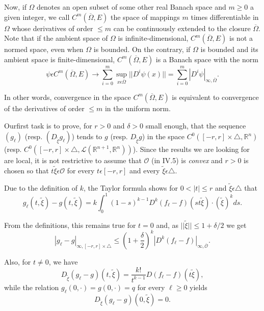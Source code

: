 Now, if $\Omega$ denotes an open subset of some other real Banach
space and $m \geq 0$ a given integer, we call
$C^{m}(\overline{\Omega}, E)$ the space of mappings $m$ times
differentiable in $\Omega$ whose derivatives of order $\leq m$ can be
continuously extended to the closure $\overline{\Omega}$. Note that if
the ambient space of $\Omega$ is infinite-dimensional,
$C^{m}(\overline{\Omega}, E)$ is not a normed space, even when
$\Omega$ is bounded. On the contrary, if $\Omega$ is bounded and its
ambient space is finite-dimensional, $C^{m}(\overline{\Omega}, E)$ is
a Banach space with the norm
$$
\psi \epsilon C^{m}(\overline{\Omega}, E) \to \sum\limits_{i=0}^{m}
\sup_{x \epsilon \overline{\Omega}} ||D^{i} \psi (x)|| =
\sum\limits_{i=0}^{m} |D^{i} \psi|_{\infty, \overline{\Omega}}.
$$

In other words, convergence in the space $C^{m}(\overline{\Omega}, E)$
is equivalent to convergence of the derivatives of order $\leq m$ in
the uniform norm.

Our\pageoriginale first task is to prove, for $r > 0$ and $\delta > 0$
small enough, that the sequence $(g_{\ell})$
(resp. $(D_{\widetilde{\xi}}g_{\ell})$) tends to $g$
(resp. $D_{\widetilde{\xi}}g$) in the space $C^{0}([-r, r] \times
\triangle, \mathbb{R}^{n})$ (resp. $C^{0} ([-r, r] \times \triangle,
\mathscr{L} (\mathbb{R}^{n+1}, \mathbb{R}^{n}))$). Since the results
we are looking for are local, it is not restrictive to assume that
$\mathscr{O}$ (in IV.5) is {\em convex} and $r > 0$ is chosen so that
$t \widetilde{\xi} \epsilon \mathscr{O}$ for every $t \epsilon [-r,
  r]$ and every $\widetilde{\xi} \epsilon \triangle$.

Due to the definition of $k$, the Taylor formula shows for $0 < |t| \leq
r$ and $\widetilde{\xi} \epsilon \triangle$ that
$$
g_{\ell} (t, \widetilde{\xi}) -g(t, \widetilde{\xi}) = k \int_{0}^{1}
(1-s)^{k-1} D^{k} (f_{\ell} - f) (st \widetilde{\xi}) \cdot
(\widetilde{\xi})^{k} ds.
$$

From the definitions, this remains true for $t = 0$ and, as
$||\widetilde{\xi}|| \leq 1 + \delta / 2$ we get
\begin{equation*}
|g_{\ell} - g|_{\infty, [-r, r] \times \triangle} \leq \left(1 +
\frac{\delta}{2}\right)^{k} |D^{k} (f_{\ell} - f)|_{\infty,
  \overline{\mathscr{O}}}.\tag{A2.1} \label{app-2-eqA2.1}
\end{equation*}

Also, for $t \neq 0$, we have
\begin{equation*}
D_{\widetilde{\xi}}(g_{\ell}-g) (t, \widetilde{\xi}) =
\frac{k!}{t^{k-1}} D(f_{\ell} - f) (t \widetilde{\xi}),\tag{A2.2}\label{app-2-eqA2.2}
\end{equation*}
while the relation $g_{\ell}(0, \cdot) = g(0, \cdot) = q$ for every
$\ell \geq 0$ yields 
\begin{equation*}
D_{\widetilde{\xi}}(g_{\ell} - g)(0, \widetilde{\xi}) = 0.\tag{A2.3}\label{app-2-eqA2.3}
\end{equation*}

